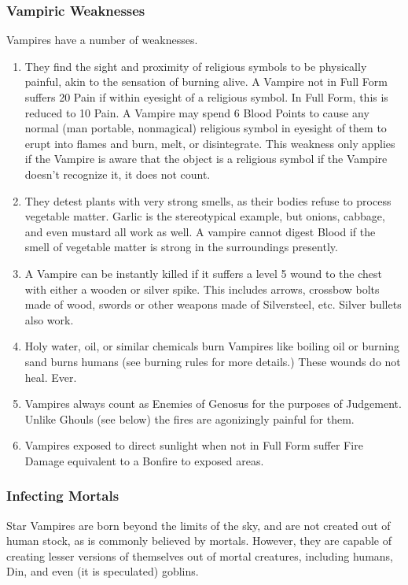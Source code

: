 \documentclass[oneside,11pt,english]{book}
\begin{document}
\subsubsection{Vampiric Weaknesses}
Vampires have a number of weaknesses.
\begin{enumerate}
\item They find the sight and proximity of religious symbols to be physically painful, akin to the 
  sensation of burning alive. A Vampire not in Full Form suffers 20 Pain if within eyesight of a 
  religious symbol. In Full Form, this is reduced to 10 Pain. A Vampire may spend 6 Blood Points 
  to cause any normal (man portable, nonmagical) religious symbol in eyesight of them to erupt 
  into flames and burn, melt, or disintegrate. This weakness only applies if the Vampire is aware 
  that the object is a religious symbol if the Vampire doesn't recognize it, it does not count. 
\item They detest plants with very strong smells, as their bodies refuse to process vegetable 
  matter. Garlic is the stereotypical example, but onions, cabbage, and even mustard all work as 
  well. A vampire cannot digest Blood if the smell of vegetable matter is strong in the 
  surroundings presently. 
\item A Vampire can be instantly killed if it suffers a level 5 wound to the chest with either a wooden 
  or silver spike. This includes arrows, crossbow bolts made of wood, swords or other weapons 
  made of Silversteel, etc. Silver bullets also work. 
\item Holy water, oil, or similar chemicals burn Vampires like boiling oil or burning sand burns 
  humans (see burning rules for more details.) These wounds do not heal. Ever.
\item Vampires always count as Enemies of Genosus for the purposes of Judgement. Unlike 
  Ghouls (see below) the fires are agonizingly painful for them. 
\item Vampires exposed to direct sunlight when not in Full Form suffer Fire Damage equivalent to a 
  Bonfire to exposed areas. 
\end{enumerate}

\subsubsection{Infecting Mortals}
Star Vampires are born beyond the limits of the sky, and are not created out of human stock, as 
is commonly believed by mortals. However, they are capable of creating lesser versions of 
themselves out of mortal creatures, including humans, Din, and even (it is speculated) goblins. 
\end{document}
